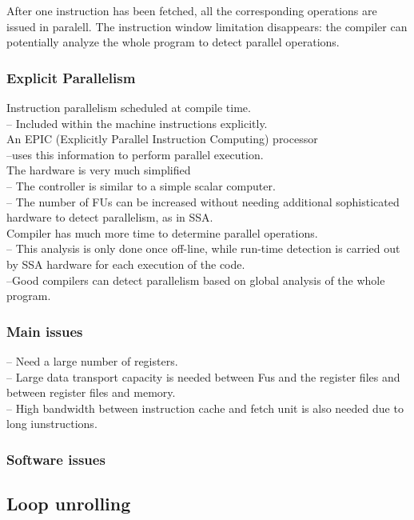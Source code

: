 \documentclass[titlepage, a4paper]{article}
\begin{document}
After one instruction has been fetched, all the corresponding operations are issued in paralell.
The instruction window limitation disappears: the compiler can potentially analyze the whole program to detect parallel operations.

\subsubsection{Explicit Parallelism}
Instruction parallelism scheduled at compile time.\\
-- Included within the machine instructions explicitly.\\

An EPIC (Explicitly Parallel Instruction Computing) processor \\
--uses this information to perform parallel execution. \\

The hardware is very much simplified \\
-- The controller is similar to a simple scalar computer. \\
-- The number of FUs can be increased without needing additional sophisticated hardware to detect parallelism, as in SSA. \\

Compiler has much more time to determine parallel operations. \\
-- This analysis is only done once off-line, while run-time detection is carried out by SSA hardware for each execution of the code. \\
--Good compilers can detect parallelism based on global analysis of the whole program. \\

\subsubsection{Main issues}
-- Need a large number of registers. \\
-- Large data transport capacity is needed between Fus and the register files and between register files and memory. \\
-- High bandwidth between instruction cache and fetch unit is also needed due to long iunstructions.

\subsubsection{Software issues}

\subsection{Loop unrolling}
\end{document}
